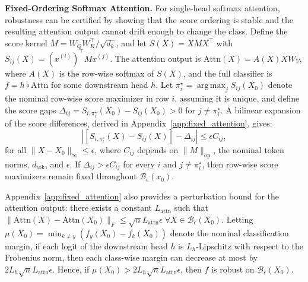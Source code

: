 \documentclass{article}
\DeclareMathOperator*{\argmax}{arg\,max}
\theoremstyle{definition}
\begin{document}
\textbf{Fixed-Ordering Softmax Attention.} 
For single-head softmax attention, robustness can be certified by showing that the score ordering is stable and the resulting attention output cannot drift enough to change the class. 
Define the score kernel $M=%
{W_QW_K^\top}/{\sqrt{d_k}}$, and let $S(X)=XMX^\top$ with $S_{ij}(X)=(x^{(i)})^\top Mx^{(j)}$. 
The attention output is $\mathrm{Attn}(X)=A(X)XW_V$, where $A(X)$ is the row-wise softmax of $S(X)$, and the full classifier is $f=h\circ \mathrm{Attn}$ for some downstream head $h$. Let $\pi_i^\star=\argmax_j S_{ij}(X_0)$ denote the nominal row-wise score maximizer in row $i$, assuming it is unique, and define the score gaps $\Delta_{ij}=S_{i,\pi_i^\star}(X_0)-S_{ij}(X_0)>0$ for $j\neq \pi_i^\star$. A bilinear expansion of the score differences, derived in
Appendix~\ref{app:fixed_attention}, gives:
\begin{equation}
    \left|
    \left[S_{i,\pi_i^\star}(X)-S_{ij}(X)\right]-\Delta_{ij}
    \right|
    \leq
    \epsilon C_{ij},
    \label{eq:attention_gap_bound}
\end{equation}
for all $\|X-X_0\|_\infty\leq\epsilon$, where $C_{ij}$ depends on $\|M\|_{\mathrm{op}}$, the nominal token norms, $d_\mathrm{tok}$, and $\epsilon$. 
If $\Delta_{ij}>\epsilon C_{ij}$ for every $i$ and $j\neq\pi_i^\star$, then row-wise score maximizers remain fixed throughout $\mathcal{B}_\epsilon(x_0)$.

Appendix~\ref{app:fixed_attention} also provides a perturbation bound for the attention output: there exists a constant $L_{\mathrm{attn}}$ such that  $\|\mathrm{Attn}(X)-\mathrm{Attn}(X_0)\|_F\leq \sqrt n L_{\mathrm{attn}}\epsilon \; \forall X\in\mathcal B_\epsilon(X_0)$. 
Letting $\mu(X_0)=\min_{k\neq y}\left(f_y(X_0)-f_k(X_0)\right)$ denote the nominal classification margin,  if each logit of the downstream head $h$ is $L_h$-Lipschitz with respect to the Frobenius norm, %
then each class-wise margin 
can decrease at most by $2L_h\sqrt n L_{\mathrm{attn}}\epsilon$. 
Hence, if $\mu(X_0)>2L_h\sqrt n L_{\mathrm{attn}}\epsilon$,
then $f$ is robust on $\mathcal B_\epsilon(X_0)$. 
\end{document}
